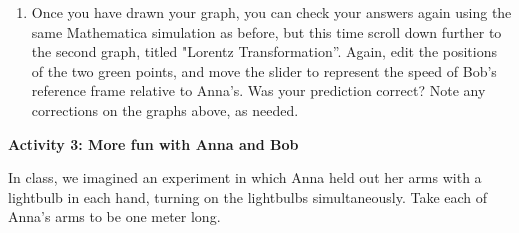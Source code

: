 \begin{enumerate}
\begin{center}
\raisebox{0.7in}{Lorentz Transformation:}\hspace{0.2in}
\begin{lab_axis}[lab_noticks_4quads,
	width=1.5in, height=1.5in,
	xlabel={$x$},
	ylabel={$t$},
	title={Anna's Frame}
	]
\end{lab_axis}
\hspace{0.3in}
\begin{lab_axis}[lab_noticks_4quads,
	width=1.5in, height=1.5in,
	xlabel={$x$},
	ylabel={$t$},
	title={Bob's Frame}
	]
\end{lab_axis}
\end{center}

\item Once you have drawn your graph, you can check your answers again using the same Mathematica simulation as before, but this time scroll down further to the second graph, titled "Lorentz Transformation''.  Again, edit the positions of the two green points, and move the slider to represent the speed of Bob's reference frame relative to Anna's.  Was your prediction correct?  Note any corrections on the graphs above, as needed. 
\end{enumerate}

\textbf{Activity 3: More fun with Anna and Bob}

In class, we imagined an experiment in which Anna held out her arms with a lightbulb in each hand, turning on the lightbulbs simultaneously.  Take each of Anna’s arms to be one meter long.

